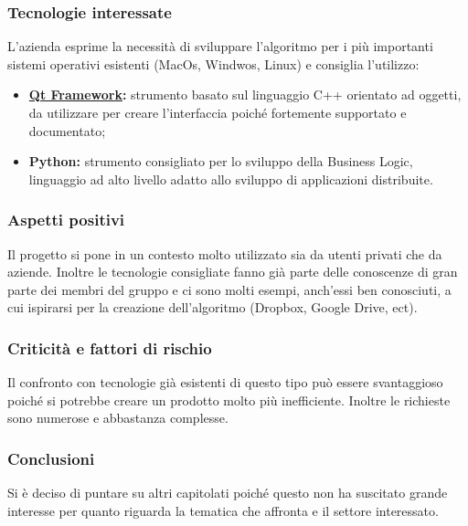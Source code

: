 \subsubsection{Tecnologie interessate}
L'azienda esprime la necessità di sviluppare l'algoritmo per i più importanti sistemi operativi esistenti (MacOs, Windwos, Linux) e consiglia l'utilizzo:
\begin{itemize}
\item \textbf{\href{https://wiki.qt.io/About_Qt}{Qt Framework}:} strumento basato sul linguaggio C++ orientato ad oggetti, da utilizzare per creare l'interfaccia poiché fortemente supportato e documentato;
\item \textbf{Python:} strumento consigliato per lo sviluppo della Business Logic, linguaggio ad alto livello adatto allo sviluppo di applicazioni distribuite.
\end{itemize}
\subsubsection{Aspetti positivi}
Il progetto si pone in un contesto molto utilizzato sia da utenti privati che da aziende. Inoltre le tecnologie consigliate fanno già parte delle conoscenze di gran parte dei membri del gruppo e ci sono molti esempi, anch'essi ben conosciuti, a cui ispirarsi per la creazione dell'algoritmo (Dropbox, Google Drive, ect).
\subsubsection{Criticità e fattori di rischio}
Il confronto con tecnologie già esistenti di questo tipo può essere svantaggioso poiché si potrebbe creare un prodotto molto più inefficiente. Inoltre le richieste sono numerose e abbastanza complesse.
\subsubsection{Conclusioni}
Si è deciso di puntare su altri capitolati poiché questo non ha suscitato grande interesse per quanto riguarda la tematica che affronta e il settore interessato.